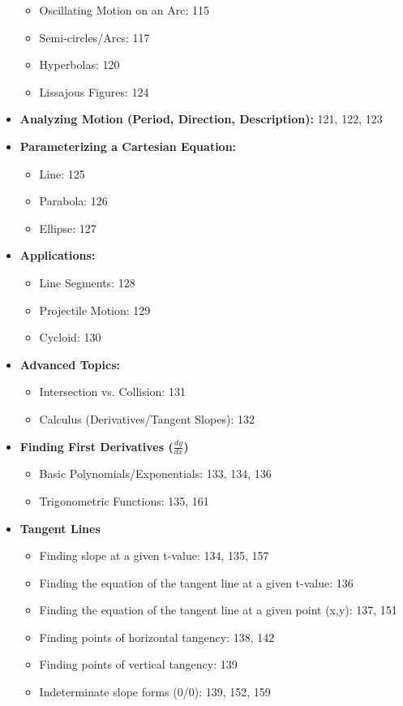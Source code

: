 \documentclass{article}
\begin{document}
\begin{itemize}
\begin{itemize}
            \item Oscillating Motion on an Arc: 115
            \item Semi-circles/Arcs: 117
            \item Hyperbolas: 120
            \item Lissajous Figures: 124
        \end{itemize}
    \item \textbf{Analyzing Motion (Period, Direction, Description):} 121, 122, 123
    \item \textbf{Parameterizing a Cartesian Equation:}
        \begin{itemize}
            \item Line: 125
            \item Parabola: 126
            \item Ellipse: 127
        \end{itemize}
    \item \textbf{Applications:}
        \begin{itemize}
            \item Line Segments: 128
            \item Projectile Motion: 129
            \item Cycloid: 130
        \end{itemize}
    \item \textbf{Advanced Topics:}
        \begin{itemize}
            \item Intersection vs. Collision: 131
            \item Calculus (Derivatives/Tangent Slopes): 132
        \end{itemize}
    \item \textbf{Finding First Derivatives ($\frac{dy}{dx}$)}
    \begin{itemize}
        \item Basic Polynomials/Exponentials: 133, 134, 136
        \item Trigonometric Functions: 135, 161
    \end{itemize}

    \item \textbf{Tangent Lines}
    \begin{itemize}
        \item Finding slope at a given t-value: 134, 135, 157
        \item Finding the equation of the tangent line at a given t-value: 136
        \item Finding the equation of the tangent line at a given point (x,y): 137, 151
        \item Finding points of horizontal tangency: 138, 142
        \item Finding points of vertical tangency: 139
        \item Indeterminate slope forms (0/0): 139, 152, 159
    \end{itemize}


\end{itemize}
\end{document}
